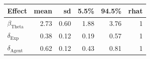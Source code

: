 
\begin{tabular}[t]{lrrrrr}
\toprule
Effect & mean & sd & 5.5\% & 94.5\% & rhat\\
\midrule
$\beta_{\text{Theta}}$ & 2.73 & 0.60 & 1.88 & 3.76 & 1\\
$\delta_{\text{Exp}}$ & 0.38 & 0.12 & 0.19 & 0.57 & 1\\
$\delta_{\text{Agent}}$ & 0.62 & 0.12 & 0.43 & 0.81 & 1\\
\bottomrule
\end{tabular}
